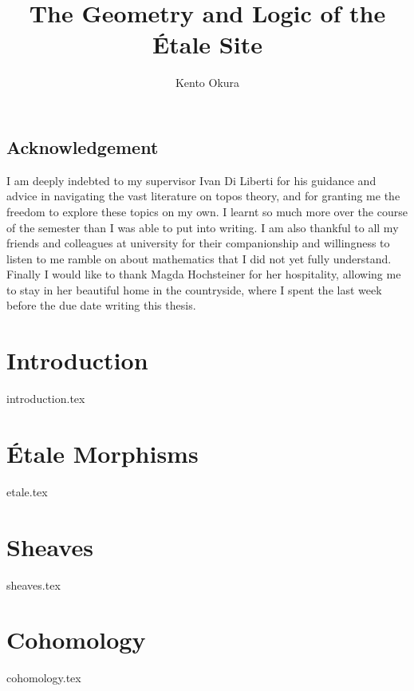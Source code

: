 \documentclass[11pt, openany]{memoir}
\title{The Geometry and Logic of the \'Etale Site}
\author{Kento Okura}
\begin{document}
\frontmatter




\section*{Acknowledgement}
I am deeply indebted to my supervisor Ivan Di Liberti for his guidance and advice in navigating the vast literature on topos theory, and for granting me the freedom to explore these topics on my own. I learnt so much more over the course of the semester than I was able to put into writing. I am also thankful to all my friends and colleagues at university for their companionship and willingness to listen to me ramble on about mathematics that I did not yet fully understand. Finally I would like to thank Magda Hochsteiner for her hospitality, allowing me to stay in her beautiful home in the countryside, where I spent the last week before the due date writing this thesis.

\newpage

\begin{KeepFromToc}
	\tableofcontents
\end{KeepFromToc}

\mainmatter

\chapter{Introduction}
{introduction.tex}

\chapter{\'Etale Morphisms}
{etale.tex}

\chapter{Sheaves}
{sheaves.tex}

\chapter{Cohomology}
{cohomology.tex}

%
%
\printbibliography
\end{document}
